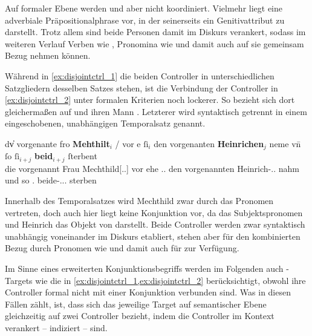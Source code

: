Auf formaler Ebene werden  und  aber nicht koordiniert.
Vielmehr liegt   eine
adverbiale Präpositionalphrase vor, in der  seinerseits ein
Genitivattribut zu   darstellt. Trotz allem sind beide
Personen damit im Diskurs verankert, sodass im weiteren Verlauf Verben wie
 , Pronomina wie   und damit auch   auf sie gemeinsam Bezug nehmen
können.

Während in \cref{ex:disjointctrl_1} die beiden Controller in unterschiedlichen
Satzgliedern desselben Satzes stehen, ist die Verbindung der Controller in
\cref{ex:disjointctrl_2} unter formalen Kriterien noch lockerer. So bezieht sich
  dort gleichermaßen auf
 und ihren Mann . Letzterer wird
syntaktisch getrennt in einem eingeschobenen, unabhängigen Temporalsatz
genannt.

\begin{exe}
\ex\label{ex:disjointctrl_2}
	\gll dv̓ vorgenante fro \textbf{Mehthilt}$_i$ / vor e ſi$_i$ den
			vorgenanten \textbf{Heinrichen}$_j$ neme \textelp{} vn̄ ſo
			ſi$_{i+j}$ \textbf{beid}$_{i+j}$ ſterbent \textelp{}
			\\
		die vorgenannt Frau Mechthild[\Nom.\Sg.\FemF] {} vor ehe
			\Tsg.\FemF.\Nom{} den vorgenannten Heinrich-\Acc.\Sg.\MascM{} nahm {}
			und so \Tpl\subMF.\Nom{} beide-\Nom.\Pl.\NeutMF.\St{} sterben {}
			\\
	\begin{taggedline}{\parencites(Freiburg i.\,Br., 1294)[\pno~2008, 253.30--39]{cao3}}
		\trans {}
	\end{taggedline}
\end{exe}

Innerhalb des Temporalsatzes wird Mechthild zwar durch das Pronomen 
 vertreten, doch auch hier liegt keine Konjunktion vor, da 
das Subjektspronomen und Heinrich das Objekt von  
darstellt. Beide Controller werden zwar syntaktisch unabhängig voneinander im
Diskurs etabliert, stehen aber für den kombinierten Bezug durch Pronomen wie
  und damit auch für 
 zur Verfügung.

Im Sinne eines erweiterten Konjunktionsbegriffs werden im Folgenden auch
-Targets wie die in \cref{ex:disjointctrl_1,ex:disjointctrl_2}
berücksichtigt, obwohl ihre Controller formal nicht mit einer Konjunktion
verbunden sind. Was in diesen Fällen zählt, ist, dass sich das jeweilige Target
auf semantischer Ebene gleichzeitig auf zwei Controller bezieht, indem die
Controller im Kontext verankert -- indiziert -- sind.
